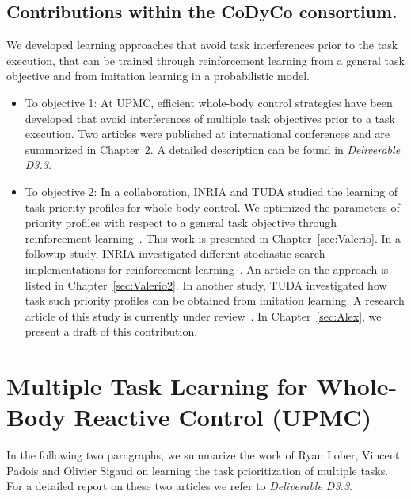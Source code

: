 \documentclass[12pt,a4paper,twoside]{report}
\begin{document}
\section{Contributions within the CoDyCo consortium.} We developed learning approaches that avoid task interferences prior to the task execution,  
that can be trained through reinforcement learning from a general task objective and from imitation learning in a probabilistic model. 
\begin{itemize}
 \item To objective 1: At UPMC, efficient whole-body control strategies have been developed that 
avoid interferences of multiple task objectives prior to a task execution. Two articles were published at international conferences and 
are summarized in Chapter~\ref{sec:Ryan}. A detailed description can be found in \textit{Deliverable D3.3}. 
\item To objective 2: In a collaboration, INRIA and TUDA studied the learning of task priority profiles for whole-body control. We optimized the parameters of priority profiles with respect to a general task objective through reinforcement learning~\cite{Modugno_PICRA_2016}. This work is presented in Chapter~\ref{sec:Valerio}.
\newline In a followup study, INRIA investigated different stochastic search implementations for reinforcement learning~\cite{modugno2016learning}. An article on the approach is listed in 
Chapter~\ref{sec:Valerio2}. 
\newline In another study, TUDA investigated how task such priority profiles can be obtained from imitation learning. 
A research article of this study is currently under review~\cite{Paraschos_2017}. In Chapter~\ref{sec:Alex}, we present a draft of this contribution. 
\end{itemize}


\chapter{Multiple Task Learning for Whole-Body Reactive Control (UPMC)}\label{sec:Ryan}

In the following two paragraphs, we summarize the work of Ryan Lober, Vincent Padois and Olivier Sigaud on 
learning the task prioritization of multiple tasks. For a detailed report on these two articles we refer to 
\textit{Deliverable D3.3}.
\end{document}
